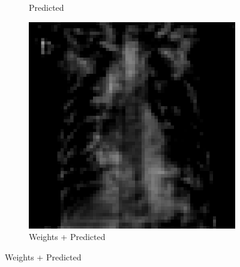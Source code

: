 \documentclass{article}
\begin{document}
\begin{figure}[!ht]
\begin{subfigure}{0.25\textwidth}
  \caption*{Predicted}\label{fig:training-1-predicted}
\end{subfigure}
\xspace
\begin{subfigure}{0.25\textwidth}%
  \includegraphics[width=\linewidth]{assets/perceptron/training-1-add.png}
  \caption*{Weights + Predicted}\label{fig:train-1-subtract}
\end{subfigure}
\end{figure}
\newpage
\end{document}
